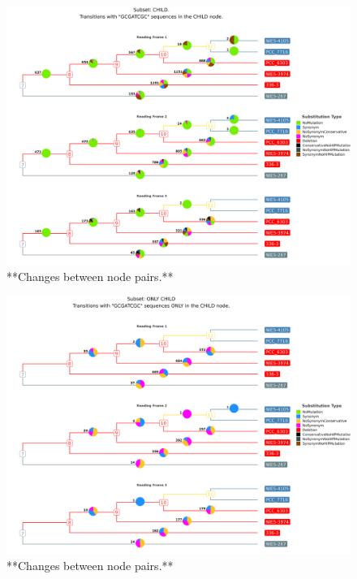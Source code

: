 \documentclass[
]{book}
\begin{document}
\begin{figure}
\includegraphics[width=1\linewidth]{figures/ALL_SITES_Actual_codon_mutations_tree} \caption{**Changes between node pairs.**}\label{fig:FIG13x}
\end{figure}
\begin{figure}
\includegraphics[width=1\linewidth]{figures/ALL_SITES_ActualO_codon_mutations_tree} \caption{**Changes between node pairs.**}\label{fig:FIG14x}
\end{figure}

\hypertarget{section}{%
\section{}\label{section}}

  
\end{document}
